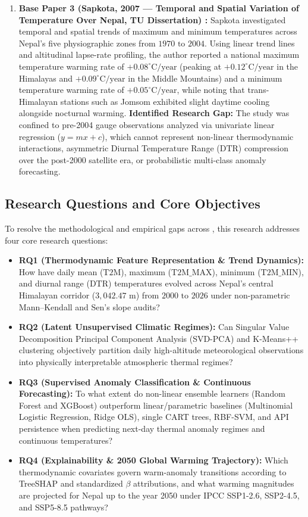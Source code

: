\documentclass[conference]{IEEEtran}
\begin{document}
\begin{enumerate}
    \item \textbf{Base Paper 3 (Sapkota, 2007 --- Temporal and Spatial Variation of Temperature Over Nepal, TU Dissertation) \cite{sapkota2007}:} Sapkota investigated temporal and spatial trends of maximum and minimum temperatures across Nepal's five physiographic zones from $1970\text{ to }2004$. Using linear trend lines and altitudinal lapse-rate profiling, the author reported a national maximum temperature warming rate of $+0.08^\circ\text{C/year}$ (peaking at $+0.12^\circ\text{C/year}$ in the Himalayas and $+0.09^\circ\text{C/year}$ in the Middle Mountains) and a minimum temperature warming rate of $+0.05^\circ\text{C/year}$, while noting that trans-Himalayan stations such as Jomsom exhibited slight daytime cooling alongside nocturnal warming. \textbf{Identified Research Gap:} The study was confined to pre-2004 gauge observations analyzed via univariate linear regression ($y = mx + c$), which cannot represent non-linear thermodynamic interactions, asymmetric Diurnal Temperature Range ($\text{DTR}$) compression over the post-2000 satellite era, or probabilistic multi-class anomaly forecasting.
\end{enumerate}

\subsection{Research Questions and Core Objectives}
To resolve the methodological and empirical gaps across \cite{nepal2025, bhattarai2022, sapkota2007}, this research addresses four core research questions:
\begin{itemize}
    \item \textbf{RQ1 (Thermodynamic Feature Representation \& Trend Dynamics):} How have daily mean ($\text{T2M}$), maximum ($\text{T2M\_MAX}$), minimum ($\text{T2M\_MIN}$), and diurnal range ($\text{DTR}$) temperatures evolved across Nepal's central Himalayan corridor ($3,042.47\text{ m}$) from $2000\text{ to }2026$ under non-parametric Mann--Kendall and Sen's slope audits?
    \item \textbf{RQ2 (Latent Unsupervised Climatic Regimes):} Can Singular Value Decomposition Principal Component Analysis (SVD-PCA) and K-Means++ clustering objectively partition daily high-altitude meteorological observations into physically interpretable atmospheric thermal regimes?
    \item \textbf{RQ3 (Supervised Anomaly Classification \& Continuous Forecasting):} To what extent do non-linear ensemble learners (Random Forest and XGBoost) outperform linear/parametric baselines (Multinomial Logistic Regression, Ridge OLS), single CART trees, RBF-SVM, and API persistence when predicting next-day thermal anomaly regimes and continuous temperatures?
    \item \textbf{RQ4 (Explainability \& 2050 Global Warming Trajectory):} Which thermodynamic covariates govern warm-anomaly transitions according to TreeSHAP and standardized $\beta$ attributions, and what warming magnitudes are projected for Nepal up to the year 2050 under IPCC SSP1-2.6, SSP2-4.5, and SSP5-8.5 pathways?
\end{itemize}
\end{document}
